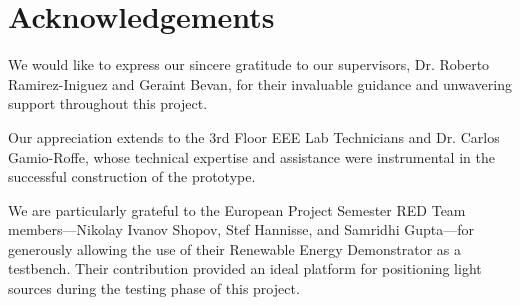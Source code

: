 \chapter{Acknowledgements}


We would like to express our sincere gratitude to our supervisors, Dr. Roberto Ramirez-Iniguez and Geraint Bevan, for their invaluable guidance and unwavering support throughout this project.

Our appreciation extends to the 3rd Floor EEE Lab Technicians and Dr. Carlos Gamio-Roffe, whose technical expertise and assistance were instrumental in the successful construction of the prototype.

We are particularly grateful to the European Project Semester RED Team members—Nikolay Ivanov Shopov, Stef Hannisse, and Samridhi Gupta—for generously allowing the use of their Renewable Energy Demonstrator as a testbench. Their contribution provided an ideal platform for positioning light sources during the testing phase of this project.